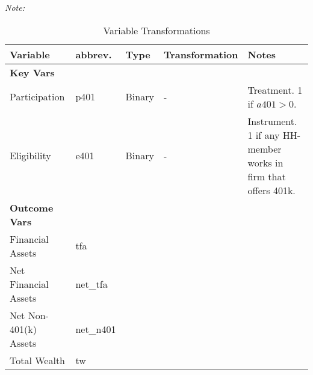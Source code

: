 \documentclass[12pt,a4paper]{article}
\begin{document}
\begin{landscape}
\begin{singlespace}
			\def\sym#1{\ifmmode^{#1}\else\(^{#1}\)\fi}
			\begin{ThreePartTable}
				\begin{TableNotes}
					\begin{scriptsize}
					\item \textit{Note:} 		
					\end{scriptsize}
				\end{TableNotes}
				
				\begin{longtable}{l C{2cm} C{4cm} C{6cm} C{6cm} }
					\caption{Variable Transformations}\label{tab_soep_transmission_all_controls}\\
					Variable & abbrev. & Type & Transformation & Notes   \\
					\midrule
					\textbf{Key Vars} & & & & \\
					Participation & p401 & Binary & - & Treatment. 1 if $a401>0$. \\
					Eligibility & e401 & Binary & - & Instrument. 1 if any HH-member works in firm that offers 401k. \\
					\midrule
					\textbf{Outcome Vars} & & & & \\
					Financial Assets & tfa & & &	\\
					Net Financial Assets & net_tfa & & &	\\
					Net Non-401(k) Assets & net_n401 & & & \\
					Total Wealth & tw & & & \\


\end{longtable}
\end{ThreePartTable}
\end{singlespace}
\end{landscape}
\end{document}
